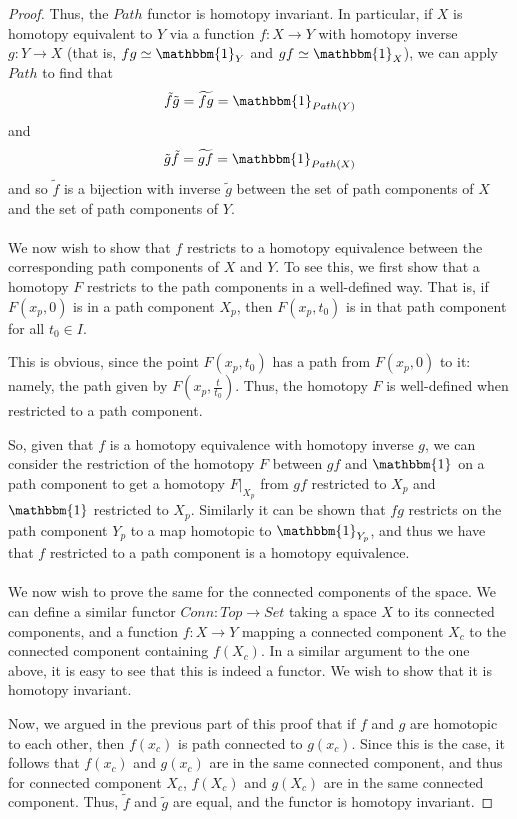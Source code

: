 \documentclass[fontsize=11pt]{scrartcl} %
\numberwithin{equation}{section} %
\numberwithin{figure}{section} %
\numberwithin{table}{section} %
\begin{document}
\begin{proof}
    Thus, the $Path$ functor is homotopy invariant. In particular, if $X$ is
    homotopy equivalent to $Y$ via a function $f:X\to Y$ with homotopy inverse
    $g:Y\to X$ (that is, $fg\simeq\mathbbm{1}_Y$ and $gf\simeq\mathbbm{1}_X$),
    we can apply $Path$ to find that 
    \[
        \tilde{f}\tilde{g} =
        \widetilde{fg}=\mathbbm{1}_{Path(Y)}
    \]
    and 
    \[
        \tilde{g}\tilde{f} = \widetilde{gf}=\mathbbm{1}_{Path(X)}
    \]
    and so $\tilde{f}$ is a bijection with inverse $\tilde{g}$ between the set
    of path components of $X$ and the set of path components of $Y$.
    \\
    \\
    We now wish to show that $f$ restricts to a homotopy equivalence between the
    corresponding path components of $X$ and $Y$. To see this, we first
    show that a homotopy $F$ restricts to the path components in
    a well-defined way. That is, if $F(x_p,0)$ is in a path component $X_p$,
    then $F(x_p,t_0)$ is in that path component for all $t_0\in I$.

    This is obvious, since the point $F(x_p,t_0)$ has a path from $F(x_p,0)$ to
    it: namely, the path given by $F(x_p,\frac{t}{t_0})$. Thus, the homotopy $F$
    is well-defined when restricted to a path component.

    So, given that $f$ is a homotopy equivalence with homotopy inverse $g$, we
    can consider the restriction of the homotopy $F$ between $gf$ and
    $\mathbbm{1}$ on a path component to get a homotopy $F|_{X_p}$ from $gf$
    restricted to $X_p$ and $\mathbbm{1}$ restricted to $X_p$.
    Similarly it can be shown that $fg$ restricts on the path component
    $Y_p$ to a map homotopic to $\mathbbm{1}_{Y_p}$, and thus we have that $f$
    restricted to a path component is a homotopy equivalence.
    \\
    \\
    We now wish to prove the same for the connected components of the space.
    We can define a similar functor $Conn:Top\to Set$ taking a space $X$ to its
    connected components, and a function $f:X\to Y$ mapping a connected
    component $X_c$ to the connected component containing $f(X_c)$. In a similar
    argument to the one above, it is easy to see that this is indeed a functor.
    We wish to show that it is homotopy invariant.

    Now, we argued in the previous part of this proof that if $f$ and $g$ are
    homotopic to each other, then $f(x_c)$ is path connected to $g(x_c)$. Since
    this is the case, it follows that $f(x_c)$ and $g(x_c)$ are in the same
    connected component, and thus for connected component $X_c$, $f(X_c)$ and
    $g(X_c)$ are in the same connected component. Thus, $\tilde{f}$ and
    $\tilde{g}$ are equal, and the functor is homotopy invariant.


\end{proof}
\end{document}
